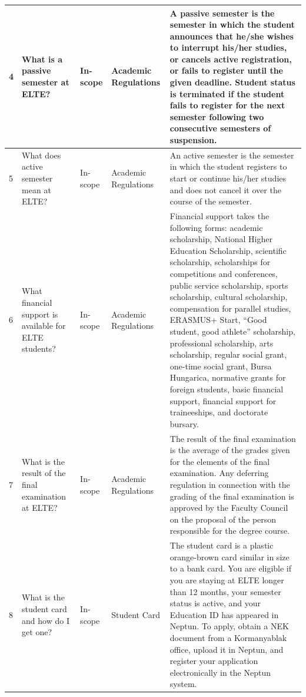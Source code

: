 \begin{longtable}{|p{}|p{}|p{}|p{}|p{}|}
    4 &
    What is a passive semester at ELTE? &
    In-scope &
    Academic Regulations &
    A passive semester is the semester in which the student announces that he/she wishes to interrupt his/her studies, or cancels active registration, or fails to register until the given deadline. Student status is terminated if the student fails to register for the next semester following two consecutive semesters of suspension. \\
    \hline

    5 &
    What does active semester mean at ELTE? &
    In-scope &
    Academic Regulations &
    An active semester is the semester in which the student registers to start or continue his/her studies and does not cancel it over the course of the semester. \\
    \hline

    6 &
    What financial support is available for ELTE students? &
    In-scope &
    Academic Regulations &
    Financial support takes the following forms: academic scholarship, National Higher Education Scholarship, scientific scholarship, scholarships for competitions and conferences, public service scholarship, sports scholarship, cultural scholarship, compensation for parallel studies, ERASMUS+ Start, ``Good student, good athlete'' scholarship, professional scholarship, arts scholarship, regular social grant, one-time social grant, Bursa Hungarica, normative grants for foreign students, basic financial support, financial support for traineeships, and doctorate bursary. \\
    \hline

    7 &
    What is the result of the final examination at ELTE? &
    In-scope &
    Academic Regulations &
    The result of the final examination is the average of the grades given for the elements of the final examination. Any deferring regulation in connection with the grading of the final examination is approved by the Faculty Council on the proposal of the person responsible for the degree course. \\
    \hline

    8 &
    What is the student card and how do I get one? &
    In-scope &
    Student Card &
    The student card is a plastic orange-brown card similar in size to a bank card. You are eligible if you are staying at ELTE longer than 12 months, your semester status is active, and your Education ID has appeared in Neptun. To apply, obtain a NEK document from a Kormanyablak office, upload it in Neptun, and register your application electronically in the Neptun system. \\
    \hline


\end{longtable}
